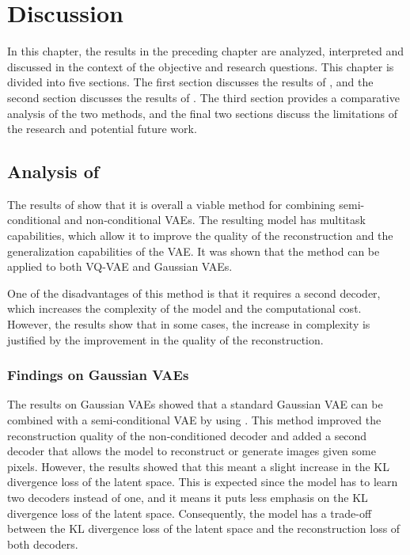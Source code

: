 \chapter{Discussion}

In this chapter, the results in the preceding chapter are analyzed, interpreted and discussed in the context of the objective and research questions. This chapter is divided into five sections. The first section discusses the results of , and the second section discusses the results of . The third section provides a comparative analysis of the two methods, and the final two sections discuss the limitations of the research and potential future work.

\section{Analysis of }

The results of  show that it is overall a viable method for combining semi-conditional and non-conditional VAEs. The resulting model has multitask capabilities, which allow it to improve the quality of the reconstruction and the generalization capabilities of the VAE. It was shown that the method can be applied to both VQ-VAE  and Gaussian VAEs.

One of the disadvantages of this method is that it requires a second decoder, which increases the complexity of the model and the computational cost. However, the results show that in some cases, the increase in complexity is justified by the improvement in the quality of the reconstruction.

\subsection{Findings on Gaussian VAEs}

The results on Gaussian VAEs showed that a standard Gaussian VAE can be combined with a semi-conditional VAE by using . This method improved the reconstruction quality of the non-conditioned decoder and added a second decoder that allows the model to reconstruct or generate images given some pixels. However, the results showed that this meant a slight increase in the KL divergence loss of the latent space. This is expected since the model has to learn two decoders instead of one, and it means it puts less emphasis on the KL divergence loss of the latent space. Consequently, the model has a trade-off between the KL divergence loss of the latent space and the reconstruction loss of both decoders.

